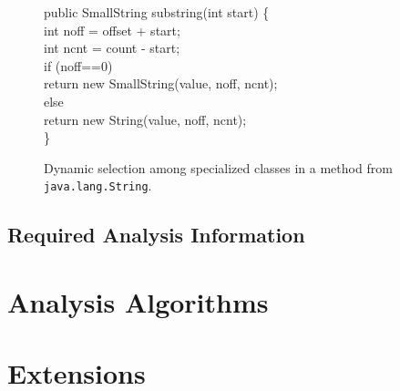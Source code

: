 \documentclass[preprint]{acmconf}
\begin{document}
\begin{figure}
\begin{samplecode}
public SmallString substring(int start) \{\\
\>int noff = offset + start;\\
\>int ncnt = count - start;\\
\>if (noff==0)\\
\>\>return new SmallString(value, noff, ncnt);\\
\>else\\
\>\>return new String(value, noff, ncnt);\\
\}\\
\end{samplecode}
\caption{Dynamic selection among specialized classes in a method
  from {\tt java.lang.String}.}
\label{fig:dyn-select}
\end{figure}

\subsection{Required Analysis Information}


\section{Analysis Algorithms}

\section{Extensions} %
\end{document}
